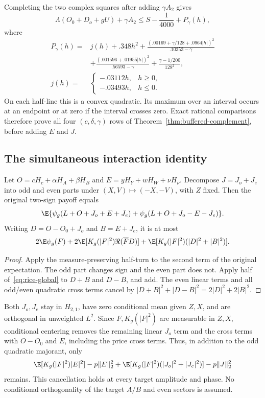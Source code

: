 Completing the two complex squares after adding $\gamma A_2$ gives
\begin{equation}
 \Lambda(O_0+D_o+gU)+\gamma A_2\le S-\frac1{4000}+P_\gamma(h),
 \label{eq:odd-completion}
\end{equation}
where
\begin{align*}
 P_\gamma(h)={}&j(h)+.348h^2
 +\frac{(.00169+\gamma/128+.0964|h|)^2}{.10353-\gamma}\\
 &+\frac{(.001596+.01955|h|)^2}{.56593-\gamma}
 +\frac{\gamma-1/200}{128^2},\\
 j(h)={}&\begin{cases}-.03112h,&h\ge0,\\-.03493h,&h\le0.\end{cases}
\end{align*}
On each half-line this is a convex quadratic. Its maximum over an interval occurs at an endpoint or at zero if the interval crosses zero. Exact rational comparisons therefore prove all four $(c,\delta,\gamma)$ rows of Theorem~\ref{thm:buffered-complement}, before adding $E$ and $J$.

\subsection{The simultaneous interaction identity}
\begin{lemma}
Let $O=cH_c+\alpha H_A+\beta H_B$ and $E=yH_Y+wH_W+\nu H_\nu$. Decompose $J=J_o+J_e$ into odd and even parts under $(X,V)\mapsto(-X,-V)$, with $Z$ fixed. Then the original two-sign payoff equals
\[
 \E\{\psi_g(L+O+J_o+E+J_e)+\psi_g(L+O+J_o-E-J_e)\}.
\]
Writing $D=O-O_0+J_o$ and $B=E+J_e$, it is at most
\begin{equation}
 2\E\psi_g(F)+2\E[K_g(|F|^2)\Re(\overline FD)]
       +\E[K_g(|F|^2)(|D|^2+|B|^2)].
 \label{eq:ch42-parity}
\end{equation}
\end{lemma}
\begin{proof}
Apply the measure-preserving half-turn to the second term of the original expectation. The odd part changes sign and the even part does not. Apply half of~\eqref{eq:rice-global} to $D+B$ and $D-B$, and add. The even linear terms and all odd/even quadratic cross terms cancel by
$|D+B|^2+|D-B|^2=2|D|^2+2|B|^2$.
\end{proof}
Both $J_o,J_e$ stay in $H_{2,1}$, have zero conditional mean given $Z,X$, and are orthogonal in unweighted $L^2$. Since $F,K_g(|F|^2)$ are measurable in $Z,X$, conditional centering removes the remaining linear $J_o$ term and the cross terms with $O-O_0$ and $E$, including the price cross terms. Thus, in addition to the odd quadratic majorant, only
\begin{equation}
 \E[K_g(|F|^2)|E|^2]-p\|E\|_2^2
 +\E[K_g(|F|^2)(|J_o|^2+|J_e|^2)]-p\|J\|_2^2
 \label{eq:ch42-extra}
\end{equation}
remains. This cancellation holds at every target amplitude and phase. No conditional orthogonality of the target $A/B$ and even sectors is assumed.

